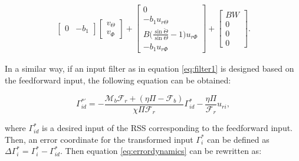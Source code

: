 \documentclass[main.tex]{subfiles}
\begin{document}
\begin{align}
\begin{bmatrix}
		 0 & -b_1 
		 \end{bmatrix}
		\begin{bmatrix}
		v_\Theta \\
		v_\Phi
		\end{bmatrix} + 
		\begin{bmatrix}
		0 \\
		-b_1 u_{r\Theta} \\
		B\bigg( \frac{\sin \check{\Theta}}{\sin \Theta} - 1 \bigg) u_{r\Phi} \\
		-b_1 u_{r\Phi}
		\end{bmatrix}+
		\begin{bmatrix}
		BW \\
		0 \\
		0 \\
		0
		\end{bmatrix}.
		\label{eq:errordynamics}
	\end{align}
	
	In a similar way, if an input filter as in equation \eqref{eq:filter1} is designed based on the feedforward input, the following equation can be obtained:
	
	\begin{equation}
			\Gamma_{id}^{*'} = -\frac{\mathcal{M}_b \mathcal{F}_r + (\eta \Pi - \mathcal{F}_b)}{\chi \Pi \mathcal{F}_r}\Gamma_{id}^{*} - \frac{\eta \Pi}{\mathcal{F}_r}u_{ri}, \label{eq:filter2} 	
	\end{equation}
	
	where $\Gamma_{id}^*$ is a desired input of the RSS corresponding to the feedforward input. Then, an error coordinate for the transformed input $\Gamma_i^*$ can be defined as $\Delta \Gamma^*_{i} = \Gamma_i^* - \Gamma_{id}^*$. Then equation \eqref{eq:errordynamics} can be rewritten as:
	
\end{document}
